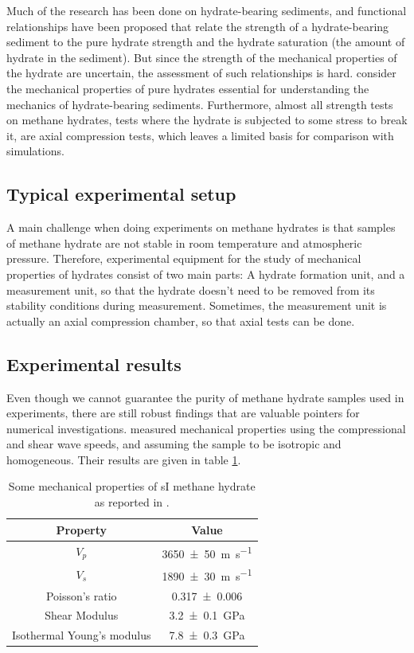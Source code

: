 Much of the research has been done on hydrate-bearing sediments, and functional relationships have been proposed that relate the strength of a hydrate-bearing sediment to the pure hydrate strength and the hydrate saturation (the amount of hydrate in the sediment). But since the strength of the mechanical properties of the hydrate are uncertain, the assessment of such relationships is hard. \citet{Ning2012} consider the mechanical properties of pure hydrates essential for understanding the mechanics of hydrate-bearing sediments. Furthermore, almost all strength tests on methane hydrates, tests where the hydrate is subjected to some stress to break it, are axial compression tests, which leaves a limited basis for comparison with simulations. 

\subsection{Typical experimental setup}
A main challenge when doing experiments on methane hydrates is that samples of methane hydrate are not stable in room temperature and atmospheric pressure. Therefore, experimental equipment for the study of mechanical properties of hydrates consist of two main parts: A hydrate formation unit, and a measurement unit, so that the hydrate doesn't need to be removed from its stability conditions during measurement. Sometimes, the measurement unit is actually an axial compression chamber, so that axial tests can be done.

\subsection{Experimental results}
Even though we cannot guarantee the purity of methane hydrate samples used in experiments, there are still robust findings that are valuable pointers for numerical investigations. \citet{Waite2000} measured mechanical properties using the compressional and shear wave speeds, and assuming the sample to be isotropic and homogeneous. Their results are given in table \ref{tbl:si_mech_exp}.

\begin{table}
\caption{Some mechanical properties of sI methane hydrate as reported in \cite{Waite2000}.}
\label{tbl:si_mech_exp}
\centering
\begin{tabular}{c|c}
Property & Value \\
\hline
$V_p$ & \SI{3650\pm 50}{\meter\per\second} \\
$V_s$ & \SI{1890\pm 30}{\meter\per\second} \\
Poisson's ratio & \SI{0.317 \pm 0.006}{} \\
Shear Modulus & \SI{3.2\pm0.1}{\giga\pascal} \\
Isothermal Young's modulus & \SI{7.8\pm 0.3}{\giga\pascal}
\end{tabular}
\end{table}

